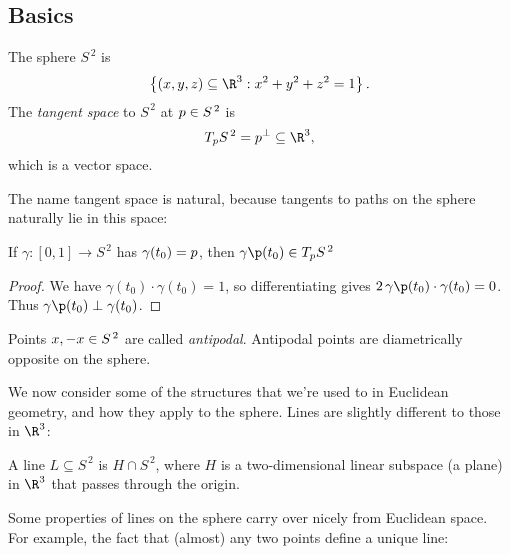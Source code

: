 \setcounter{lecture}{2}

\subsection{Basics} %
\label{sub:basics}

\begin{definition}
	The {sphere $S^{\,2}$} is
	\begin{equation*}
		\left\{ (x,y,z) \subseteq \R^3 : x^2 + y^2 + z^2 = 1 \right\}.
	\end{equation*}
	The \emph{tangent space} to $S^{\,2}$ at $p\in S^{\,2}$ is
	\begin{equation*}
		T_{\pp}S^{\,2} = \pp^\perp \subseteq \R^3,
	\end{equation*}
	which is a vector space.
\end{definition}

The name tangent space is natural, because tangents to paths on the sphere naturally lie in this space:

\begin{proposition}
	If $\gamma:[0,1]\to S^{\,2}$ has $\gamma(t_0)=p$, then $\gamma\p(t_0) \in T_{\pp}S^{\,2}$ %
\end{proposition}

\begin{proof}
	We have $\gamma(t_0) \cdot \gamma(t_0) = 1$, so differentiating gives $2\,\gamma\p(t_0) \cdot \gamma(t_0) = 0$. Thus $\gamma\p(t_0) \perp \gamma(t_0)$. %
\end{proof}

\begin{definition}
	Points $x,-x \in S^{\,2}$ are called \emph{antipodal}. Antipodal points are diametrically opposite on the sphere. %
\end{definition}

We now consider some of the structures that we're used to in Euclidean geometry, and how they apply to the sphere. Lines are slightly different to those in $\R^3$:

\begin{definition}
	A line $L\subseteq S^{\,2}$ is $H\cap S^{\,2}$, where $H$ is a two-dimensional linear subspace (a plane) in $\R^3$ that passes through the origin.
\end{definition}

Some properties of lines on the sphere carry over nicely from Euclidean space. For example, the fact that (almost) any two points define a unique line:

